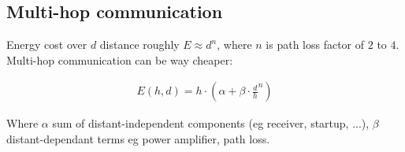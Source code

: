 \subsection{Multi-hop communication}

Energy cost over $d$ distance roughly $E \approx d^n$, where $n$ is path loss
factor of $2$ to $4$. Multi-hop communication can be way cheaper:

\begin{align*}
		E(h, d) = h \cdot(\alpha + \beta \cdot \frac{d}{h}^n)
\end{align*}

Where $\alpha$ sum of distant-independent components (eg receiver, startup,
...), $\beta$ distant-dependant terms eg power amplifier, path loss.
